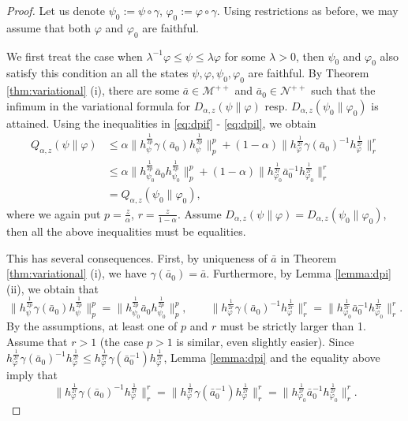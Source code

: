 \documentclass[12pt]{article}
\theoremstyle{definition}
\theoremstyle{remark}
\numberwithin{equation}{section}
\def\Me{\mathcal M}
\def\Ne{\mathcal N}
\begin{document}
\begin{proof} Let us denote $\psi_0:=\psi\circ\gamma$, $\varphi_0:=\varphi\circ\gamma$.
Using restrictions as before, we may assume that both $\varphi$ and $\varphi_0$ are
faithful.

We first treat the case when  $\lambda^{-1}\varphi\le \psi\le \lambda\varphi$ for
some $\lambda>0$, then
$\psi_0$ and $\varphi_0$ also satisfy this condition an all the states
$\psi,\varphi,\psi_0,\varphi_0$ are faithful. By Theorem \ref{thm:variational}
(i), there are  some $\bar a\in \Me^{++}$ and  $\bar a_0\in \Ne^{++}$ such that the
infimum in the variational formula for $D_{\alpha,z}(\psi\|\varphi)$ resp.
$D_{\alpha,z}(\psi_0\|\varphi_0)$ is attained. Using the inequalities in \eqref{eq:dpif} -
\eqref{eq:dpil}, we obtain
\begin{align*}
Q_{\alpha,z}(\psi\|\varphi)&\le \alpha\|h_\psi^{\frac{1}{2p}}\gamma(\bar a_0)h_\psi^{\frac{1}{2p}}\|_p^p+
(1-\alpha)\|h_\varphi^{\frac{1}{2r}}\gamma(\bar a_0)^{-1}h_\varphi^{\frac{1}{2r}}\|_r^r\\
&\le \alpha\|h_{\psi_0}^{\frac{1}{2p}}\bar a_0h_{\psi_0}^{\frac{1}{2p}}\|_p^p+
(1-\alpha)\|h_{\varphi_0}^{\frac{1}{2r}}\bar
a_0^{-1}h_{\varphi_0}^{\frac{1}{2r}}\|_r^r\\
&= Q_{\alpha,z}(\psi_0\|\varphi_0),
\end{align*}
where we again put $p=\frac{z}{\alpha}$, $r=\frac{z}{1-\alpha}$. Assume
$D_{\alpha,z}(\psi\|\varphi)=D_{\alpha,z}(\psi_0\|\varphi_0)$, then all the above
inequalities must be equalities. 

This has several consequences. First, by uniqueness of $\bar a$ in Theorem
\ref{thm:variational} (i), we have $\gamma(\bar a_0)=\bar a$. Furthermore, by Lemma
\ref{lemma:dpi} (ii), we obtain that 
\[
\|h_\psi^{\frac{1}{2p}}\gamma(\bar
a_0)h_\psi^{\frac{1}{2p}}\|_p^p=\|h_{\psi_0}^{\frac{1}{2p}}\bar
a_0h_{\psi_0}^{\frac{1}{2p}}\|_p^p,\qquad \|h_\varphi^{\frac{1}{2r}}\gamma(\bar
a_0)^{-1}h_\varphi^{\frac{1}{2r}}\|_r^r=\|h_{\varphi_0}^{\frac{1}{2r}}\bar
a_0^{-1}h_{\varphi_0}^{\frac{1}{2r}}\|_r^r.
\]
By the assumptions, at least one of $p$ and $r$ must be strictly larger than 1. Assume
that $r>1$ (the case $p>1$ is similar, even slightly easier). 
Since $h_\varphi^{\frac{1}{2r}}\gamma(\bar a_0)^{-1}h_\varphi^{\frac{1}{2r}} \le
h_\varphi^{\frac{1}{2r}}\gamma(\bar a_0^{-1})h_\varphi^{\frac{1}{2r}}$, Lemma
\ref{lemma:dpi} and the equality above imply that
\begin{equation}\label{eq:norms}
\|h_\varphi^{\frac{1}{2r}}\gamma(\bar a_0)^{-1}h_\varphi^{\frac{1}{2r}}\|_r^r =
\|h_\varphi^{\frac{1}{2r}}\gamma(\bar a_0^{-1})h_\varphi^{\frac{1}{2r}}\|_r^r=\|h_{\varphi_0}^{\frac{1}{2r}}\bar
a_0^{-1}h_{\varphi_0}^{\frac{1}{2r}}\|_r^r.
\end{equation}


\end{proof}
\end{document}
